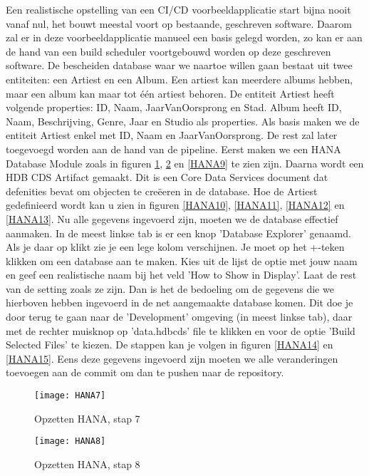             Een realistische opstelling van een CI/CD voorbeeldapplicatie start bijna nooit vanaf nul, het bouwt meestal voort op bestaande, geschreven software.
            Daarom zal er in deze voorbeeldapplicatie manueel een basis gelegd worden, zo kan er aan de hand van een build scheduler voortgebouwd worden op deze geschreven software.
            De bescheiden database waar we naartoe willen gaan bestaat uit twee entiteiten: een Artiest en een Album. Een artiest kan meerdere albums hebben, maar een album kan maar tot één artiest behoren. De entiteit Artiest heeft volgende properties: ID, Naam, JaarVanOorsprong en Stad. Album heeft ID, Naam, Beschrijving, Genre, Jaar en Studio als properties. Als basis maken we de entiteit Artiest enkel met ID, Naam en JaarVanOorsprong. De rest zal later toegevoegd worden aan de hand van de pipeline.
            Eerst maken we een HANA Database Module zoals in figuren \ref{HANA7}, \ref{HANA8} en \ref{HANA9} te zien zijn. Daarna wordt een HDB CDS Artifact gemaakt. Dit is een Core Data Services document dat defenities bevat om objecten te creëeren in de database. Hoe de Artiest gedefinieerd wordt kan u zien in figuren \ref{HANA10}, \ref{HANA11}, \ref{HANA12} en \ref{HANA13}.
            Nu alle gegevens ingevoerd zijn, moeten we de database effectief aanmaken. In de meest linkse tab is er een knop 'Database Explorer' genaamd. Als je daar op klikt zie je een lege kolom verschijnen. Je moet op het +-teken klikken om een database aan te maken. Kies uit de lijst de optie met jouw naam en geef een realistische naam bij het veld 'How to Show in Display'. Laat de rest van de setting zoals ze zijn.
            Dan is het de bedoeling om de gegevens die we hierboven hebben ingevoerd in de net aangemaakte database komen. Dit doe je door terug te gaan naar de 'Development' omgeving (in meest linkse tab), daar met de rechter muisknop op 'data.hdbcds' file te klikken en voor de optie 'Build Selected Files' te kiezen. De stappen kan je volgen in figuren \ref{HANA14} en \ref{HANA15}.
            Eens deze gegevens ingevoerd zijn moeten we alle veranderingen toevoegen aan de commit om dan te pushen naar de repository.
            
            \begin{figure}	
                \centering
                \texttt{[image: HANA7]}
                \caption{Opzetten HANA, stap 7} \label{HANA7}
            \end{figure}
            
            \begin{figure}	
                \centering
                \texttt{[image: HANA8]}
                \caption{Opzetten HANA, stap 8} \label{HANA8}
            \end{figure}
            

